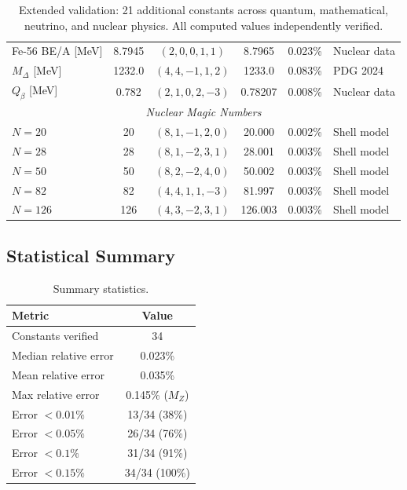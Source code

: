 \documentclass[aps,prd,preprint,superscriptaddress,showpacs,nofootinbib,longbibliography]{revtex4-2}
\begin{document}
\begin{table}[t]
\begin{tabular}{@{}lccccl@{}}
Fe-56 BE/A [\si{MeV}] & 8.7945 & $(2,0,0,1,1)$ & 8.7965 & 0.023\% & Nuclear data \\
$M_\Delta$ [\si{MeV}] & 1232.0 & $(4,4,-1,1,2)$ & 1233.0 & 0.083\% & PDG 2024 \\
$Q_\beta$ [\si{MeV}] & 0.782 & $(2,1,0,2,-3)$ & 0.78207 & 0.008\% & Nuclear data \\
\midrule
\multicolumn{6}{c}{\textit{Nuclear Magic Numbers}} \\
$N = 20$ & 20 & $(8,1,-1,2,0)$ & 20.000 & 0.002\% & Shell model \\
$N = 28$ & 28 & $(8,1,-2,3,1)$ & 28.001 & 0.003\% & Shell model \\
$N = 50$ & 50 & $(8,2,-2,4,0)$ & 50.002 & 0.003\% & Shell model \\
$N = 82$ & 82 & $(4,4,1,1,-3)$ & 81.997 & 0.003\% & Shell model \\
$N = 126$ & 126 & $(4,3,-2,3,1)$ & 126.003 & 0.003\% & Shell model \\
\bottomrule
\end{tabular}
\caption{Extended validation: 21 additional constants across quantum, mathematical, neutrino, and nuclear physics. All computed values independently verified.}
\label{tab:extended}
\end{table}

\subsection{Statistical Summary}

\begin{table}[h]
\centering
\begin{tabular}{@{}lc@{}}
\toprule
\textbf{Metric} & \textbf{Value} \\
\midrule
Constants verified & 34 \\
Median relative error & 0.023\% \\
Mean relative error & 0.035\% \\
Max relative error & 0.145\% ($M_Z$) \\
Error $< 0.01\%$ & 13/34 (38\%) \\
Error $< 0.05\%$ & 26/34 (76\%) \\
Error $< 0.1\%$ & 31/34 (91\%) \\
Error $< 0.15\%$ & 34/34 (100\%) \\
\bottomrule
\end{tabular}
\caption{Summary statistics.}
\label{tab:stats}
\end{table}
\end{document}
